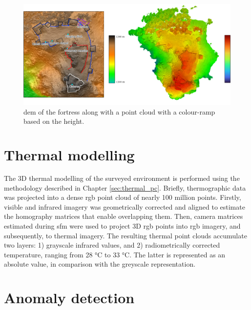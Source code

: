 \begin{figure}[htbp]
    \centering
    \includegraphics[width=\linewidth]{figs/castle_puerta_arenas/fortress_height.png}
    \caption{\acrshort{dem} of the fortress along with a point cloud with a colour-ramp based on the height. }
    \label{fig:thermal_castle_dem}
\end{figure}

\section{Thermal modelling}

The 3D thermal modelling of the surveyed environment is performed using the methodology described in Chapter \ref{sec:thermal_pc}. Briefly, thermographic data was projected into a dense \acrshort{rgb} point cloud of nearly 100 million points. Firstly, visible and infrared imagery was geometrically corrected and aligned to estimate the homography matrices that enable overlapping them. Then, camera matrices estimated during \acrshort{sfm} were used to project 3D \acrshort{rgb} points into \acrshort{rgb} imagery, and subsequently, to thermal imagery. The resulting thermal point clouds accumulate two layers: 1) grayscale infrared values, and 2) radiometrically corrected temperature, ranging from 28 \si{\celsius} to 33 \si{\celsius}. The latter is represented as an absolute value, in comparison with the greyscale representation.

\section{Anomaly detection}

